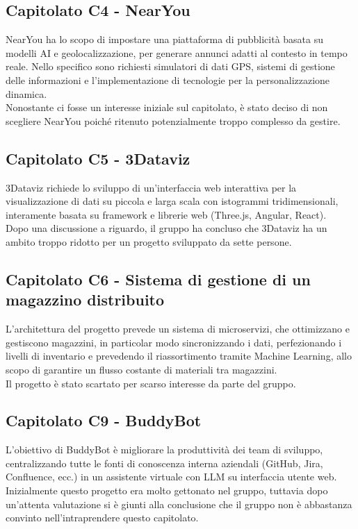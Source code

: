 \documentclass[10pt]{article}
\begin{document}
    \subsection{Capitolato C4 - NearYou}
    NearYou ha lo scopo di impostare una piattaforma di pubblicità basata su modelli AI e geolocalizzazione,
    per generare annunci adatti al contesto in tempo reale. Nello specifico sono richiesti simulatori di dati GPS,
    sistemi di gestione delle informazioni e l'implementazione di tecnologie per la personalizzazione dinamica.\\
    Nonostante ci fosse un interesse iniziale sul capitolato, è stato deciso di non scegliere NearYou poiché ritenuto potenzialmente
    troppo complesso da gestire.
    
    \subsection{Capitolato C5 - 3Dataviz}
    3Dataviz richiede lo sviluppo di un'interfaccia web interattiva per la visualizzazione di dati su piccola e larga scala con istogrammi tridimensionali,
    interamente basata su framework e librerie web (Three.js, Angular, React).\\
    Dopo una discussione a riguardo, il gruppo ha concluso che 3Dataviz ha un ambito troppo ridotto per un progetto
    sviluppato da sette persone.
    
    \subsection{Capitolato C6 - Sistema di gestione di un magazzino distribuito}
    L'architettura del progetto prevede un sistema di microservizi, che ottimizzano e gestiscono magazzini, in particolar
    modo sincronizzando i dati, perfezionando i livelli di inventario e prevedendo
    il riassortimento tramite Machine Learning, allo scopo di garantire un flusso costante di materiali tra magazzini.\\
    Il progetto è stato scartato per scarso interesse da parte del gruppo.
    
    \subsection{Capitolato C9 - BuddyBot}
    L'obiettivo di BuddyBot è migliorare la produttività dei team di sviluppo, centralizzando tutte le fonti di
    conoscenza interna aziendali (GitHub, Jira, Confluence, ecc.) in un assistente virtuale con LLM su interfaccia utente web.\\
    Inizialmente questo progetto era molto gettonato nel gruppo, tuttavia dopo un'attenta valutazione si è giunti alla conclusione
    che il gruppo non è abbastanza convinto nell'intraprendere questo capitolato.
    
\end{document}
